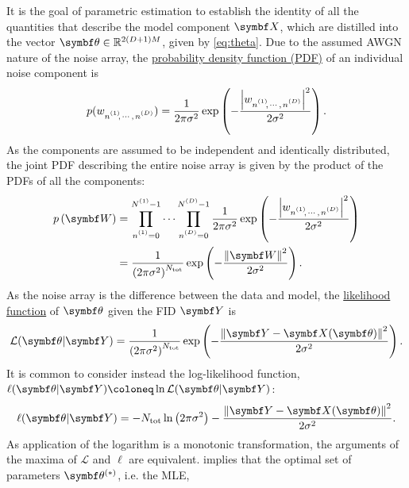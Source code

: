It is the goal of parametric estimation to establish the
identity of all the quantities that describe the model component $\bX$, which
are distilled into the vector $\bth \in \mathbb{R}^{2(D + 1)M}$, given by
\cref{eq:theta}.
Due to the assumed \ac{AWGN} nature of the noise array, the
\ul{probability density function (PDF)} of an individual noise
component is
\begin{equation}
    p(\wnonenD) =
        \frac{1}{2\pi \sigma^2}
        \exp\left( -\frac{\left\lvert \wnonenD \right\rvert^2}{2\sigma^2}\right).
\end{equation}
As the components are assumed to be independent and identically distributed, the
joint \ac{PDF} describing the entire noise array is given by the product of the
\acp{PDF} of all the components:
\begin{equation}
    \begin{split}
        p\left(\bW\right) &=
            \prod_{\none=0}^{\None - 1}
            \cdots
            \prod_{\nD=0}^{\ND - 1}
            \frac{1}{2\pi \sigma^2}
            \exp\left(
                -\frac
                {\left\lvert \wnonenD \right\rvert^2}
                {2\sigma^2}\right) \\
            &= \frac{1}{\left(2\pi \sigma^2\right)^{N_{\text{tot}}}}
            \exp\left( -\frac{\left\lVert \bW \right\rVert^2}{2\sigma^2}\right).
    \end{split}
\end{equation}
As the noise array is the difference between the data and model, the
\ul{likelihood function} of $\bth$ given the \ac{FID} $\bY$ is
\begin{equation}
    \mathcal{L}(\bth \vert \bY) =
    \frac{1}{\left(2\pi \sigma^2\right)^{N_{\text{tot}}}}
        \exp\left( -\frac{\left\lVert \bY - \bX(\bth) \right\rVert^2}{2\sigma^2}\right).
\end{equation}
It is common to consider instead the log-likelihood function,
$\ell(\bth \vert \bY) \coloneq \ln \mathcal{L}(\bth \vert
\bY)$:
\begin{equation}
    \ell(\bth \vert \bY) =
        -N_{\text{tot}} \ln\left(2 \pi \sigma^2\right)
        -\frac{\left\lVert \bY - \bX(\bth) \right\rVert^2}{2\sigma^2}.
    \label{eq:log-likeihood}
\end{equation}
As application of the logarithm is a monotonic transformation, the
arguments of the maxima of $\mathcal{L}$ and $\ell$ are equivalent.
 implies that the optimal set of parameters
$\bth^{(*)}$, i.e. the \ac{MLE},
